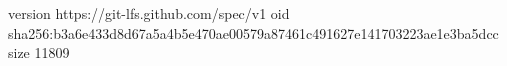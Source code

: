 version https://git-lfs.github.com/spec/v1
oid sha256:b3a6e433d8d67a5a4b5e470ae00579a87461c491627e141703223ae1e3ba5dcc
size 11809
